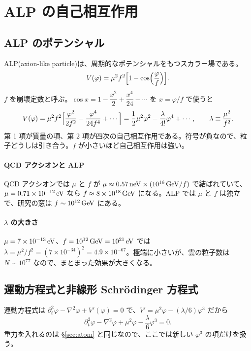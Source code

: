 \section{ALP の自己相互作用}\label{sec:selfint}

\subsection{ALP のポテンシャル}

ALP(axion-like particle)は、周期的なポテンシャルをもつスカラー場である。
\begin{equation}
V(\varphi)=\mu^2f^2\Bigl[1-\cos\Bigl(\frac{\varphi}{f}\Bigr)\Bigr].
\label{eq:Vcos}
\end{equation}
$f$ を崩壊定数と呼ぶ。$\cos x=1-\dfrac{x^2}{2}+\dfrac{x^4}{24}-\cdots$ を $x=\varphi/f$ で使うと
\begin{equation}
V(\varphi)=\mu^2f^2\Bigl[\frac{\varphi^2}{2f^2}-\frac{\varphi^4}{24f^4}+\cdots\Bigr]
=\frac12\mu^2\varphi^2-\frac{\lambda}{4!}\varphi^4+\cdots,
\qquad \lambda\equiv\frac{\mu^2}{f^2}.
\label{eq:Vexpand}
\end{equation}
第 1 項が質量の項、第 2 項が四次の自己相互作用である。符号が負なので、粒子どうしは引き合う。$f$ が小さいほど自己相互作用は強い。

\paragraph{QCD アクシオンと ALP}
QCD アクシオンでは $\mu$ と $f$ が $\mu\approx0.57\,\mathrm{neV}\times(10^{16}\,\mathrm{GeV}/f)$ で結ばれていて、$\mu=0.71\times10^{-12}\,\mathrm{eV}$ なら $f\approx8\times10^{18}\,\mathrm{GeV}$ になる。ALP では $\mu$ と $f$ は独立で、研究の窓は $f\sim10^{12}\,\mathrm{GeV}$ にある。

\paragraph{$\lambda$ の大きさ}
$\mu=7\times10^{-13}\,\mathrm{eV}$、$f=10^{12}\,\mathrm{GeV}=10^{21}\,\mathrm{eV}$ では $\lambda=\mu^2/f^2=(7\times10^{-34})^2=4.9\times10^{-67}$。極端に小さいが、雲の粒子数は $N\sim10^{77}$ なので、まとまった効果が大きくなる。

\subsection{運動方程式と非線形 Schr\"odinger 方程式}

運動方程式は $\partial_t^2\varphi-\nabla^2\varphi+V'(\varphi)=0$ で、$V'=\mu^2\varphi-(\lambda/6)\varphi^3$ だから
\begin{equation}
\partial_t^2\varphi-\nabla^2\varphi+\mu^2\varphi-\frac{\lambda}{6}\varphi^3=0.
\label{eq:EOM_lambda}
\end{equation}
重力を入れるのは \S\ref{sec:atom} と同じなので、ここでは新しい $\varphi^3$ の項だけを扱う。

